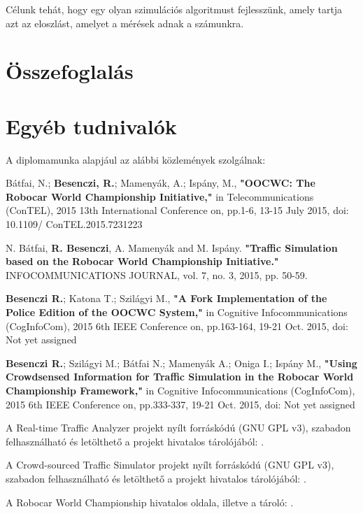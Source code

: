 \documentclass[a4paper,12pt]{report}
\begin{document}
Célunk tehát, hogy egy olyan szimulációs algoritmust fejlesszünk, amely tartja azt az eloszlást, amelyet a mérések adnak a számunkra.

\chapter{Összefoglalás}
\label{summary}





\chapter*{Egyéb tudnivalók}

A diplomamunka alapjául az alábbi közlemények szolgálnak:

Bátfai, N.; {\bf{Besenczi, R.}}; Mamenyák, A.; Ispány, M., {\bf{"OOCWC: The Robocar World Championship Initiative,"}} in Telecommunications (ConTEL), 2015 13th International Conference on, pp.1-6, 13-15 July 2015, doi: 10.1109/ ConTEL.2015.7231223

N. Bátfai, {\bf{R. Besenczi}}, A. Mamenyák and M. Ispány. {\bf{"Traffic Simulation based on the Robocar World Championship Initiative."}} INFOCOMMUNICATIONS JOURNAL, vol. 7, no. 3, 2015, pp. 50-59.

{\bf{Besenczi R.}}; Katona T.; Szilágyi M., {\bf{"A Fork Implementation of the Police Edition of the OOCWC System,"}} in Cognitive Infocommunications (CogInfoCom), 2015 6th IEEE Conference on, pp.163-164, 19-21 Oct. 2015, doi: Not yet assigned

{\bf{Besenczi R.}}; Szilágyi M.; Bátfai N.; Mamenyák A.; Oniga I.; Ispány M., {\bf{"Using Crowdsensed Information for Traffic Simulation in the Robocar World Championship Framework,"}} in Cognitive Infocommunications (CogInfoCom), 2015 6th IEEE Conference on, pp.333-337, 19-21 Oct. 2015, doi: Not yet assigned

A Real-time Traffic Analyzer projekt nyílt forráskódú (GNU GPL v3), szabadon felhasználható és letölthető a projekt hivatalos tárolójából: \cite{rtta}.

A Crowd-sourced Traffic Simulator projekt nyílt forráskódú (GNU GPL v3), szabadon felhasználható és letölthető a projekt hivatalos tárolójából: \cite{csts}.

A Robocar World Championship hivatalos oldala, illetve a tároló: \cite{oocwcrepo}.
\end{document}
